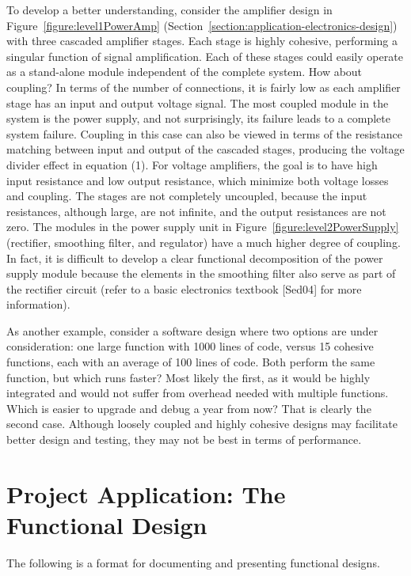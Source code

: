 To develop a better understanding, consider the amplifier design in
Figure~\ref{figure:level1PowerAmp}
(Section~\ref{section:application-electronics-design}) 
with three cascaded amplifier stages. Each
stage is highly cohesive, performing a singular function of signal
amplification. Each of these stages could easily operate as a
stand-alone module independent of the complete system. How about
coupling? In terms of the number of connections, it is fairly low as
each amplifier stage has an input and output voltage signal. The most
coupled module in the system is the power supply, and not surprisingly,
its failure leads to a complete system failure. Coupling in this case
can also be viewed in terms of the resistance matching between input and
output of the cascaded stages, producing the voltage divider effect in
equation (1). For voltage amplifiers, the goal is to have high input
resistance and low output resistance, which minimize both voltage losses
and coupling. The stages are not completely uncoupled, because the input
resistances, although large, are not infinite, and the output
resistances are not zero. The modules in the power supply unit in 
Figure~\ref{figure:level2PowerSupply}
(rectifier, smoothing filter, and regulator) have a much higher
degree of coupling. In fact, it is difficult to develop a clear
functional decomposition of the power supply module because the elements
in the smoothing filter also serve as part of the rectifier circuit
(refer to a basic electronics textbook {[}Sed04{]} for more
information).

As another example, consider a software design where two options are
under consideration: one large function with 1000 lines of code, versus
15 cohesive functions, each with an average of 100 lines of code. Both
perform the same function, but which runs faster? Most likely the first,
as it would be highly integrated and would not suffer from overhead
needed with multiple functions. Which is easier to upgrade and debug a
year from now? That is clearly the second case. Although loosely coupled
and highly cohesive designs may facilitate better design and testing,
they may not be best in terms of performance.

\section{Project Application: The Functional Design}
\label{section:project-application-the-functional-design}

The following is a format for documenting and presenting functional
designs.

